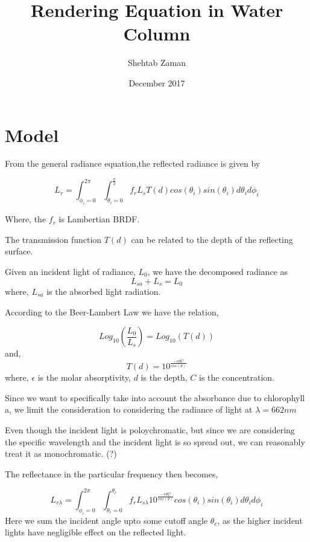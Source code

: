 \documentclass{article}
\title{Rendering Equation in Water Column}
\author{Shehtab Zaman }
\date{December 2017}
\begin{document}
\section{Model}

From the general radiance equation,the reflected radiance is given by

\begin{equation}
  L_r = \int^{2\pi}_{\phi_i = 0}\int^{\frac{\pi}{2}}_{\theta_i = 0}
  f_r L_s T(d)cos(\theta_i)sin(\theta_i)d\theta_i d\phi_i
\end{equation}

Where, the $ f_r$ is Lambertian BRDF.

The transmission function $T(d)$ can be related to the depth of the reflecting
surface.

Given an incident light of radiance, $L_0$,
we have the decomposed radiance as
$$L_{sa} + L_{s} = L_0$$
where, $ L_{sa}$ is the absorbed light radiation.



According to the Beer-Lambert Law we have the relation,

\begin{equation}
  Log_{10}\left(\frac{L_0}{L_{s}}\right) = Log_{10}(T(d))
\end{equation}
and,
\begin{equation}
  T(d) = 10^\frac{-\epsilon d C}{cos(\theta)}
\end{equation}
where, $\epsilon$ is the molar absorptivity, $ d$ is the depth, $ C$ is the concentration.

Since we want to specifically take into account the
absorbance due to chlorophyll a, we limit the consideration
to considering the radiance of light at $\lambda = 662nm$

Even though the incident light is poloychromatic, but since we are considering the specific wavelength
and the incident light is so spread out, we can reasonably treat it as monochromatic. (?)

The reflectance in the particular frequency then becomes,

\begin{equation}
  L_{r \lambda} = \int^{2\pi}_{\phi_i = 0}\int^{\theta_c}_{\theta_i = 0}
  f_r L_{s\lambda} 10^\frac{-\epsilon d C}{cos(\theta)}cos(\theta_i)sin(\theta_i)d\theta_i d\phi_i
\end{equation}
Here we sum the incident angle upto some cutoff angle $\theta_c$, as the higher incident lights
have negligible effect on the reflected light.
\end{document}
